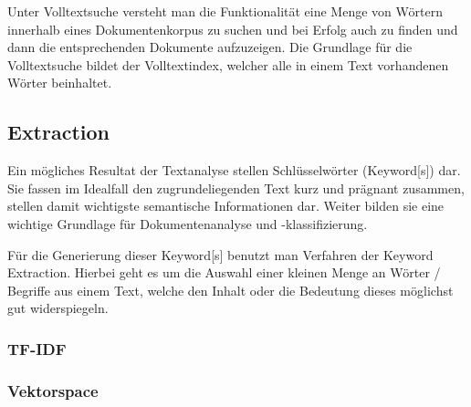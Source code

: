 
Unter \gls{Volltextsuche} versteht man die Funktionalität eine Menge von Wörtern innerhalb eines Dokumentenkorpus zu suchen und bei Erfolg auch zu finden und dann die entsprechenden Dokumente aufzuzeigen. Die Grundlage für die \gls{Volltextsuche} bildet der Volltextindex, welcher alle in einem Text vorhandenen Wörter beinhaltet.




\subsection{\gls{Extraction}}\label{keyword-extraction}


Ein mögliches Resultat der \gls{Textanalyse} stellen Schlüsselwörter (\gls{Keyword}[s]) dar. Sie fassen im Idealfall den zugrundeliegenden Text kurz und prägnant zusammen, stellen damit wichtigste semantische Informationen dar. Weiter bilden sie eine wichtige Grundlage für Dokumentenanalyse und -klassifizierung. 
\\\cite[S.~85]{Zhang2006}


Für die Generierung dieser \gls{Keyword}[s] benutzt man Verfahren der \gls{Keyword Extraction}. Hierbei geht es um die Auswahl einer kleinen Menge an Wörter / Begriffe aus einem Text, welche den Inhalt oder die Bedeutung dieses möglichst gut widerspiegeln.
\\\cite{hulth2004}


\subsubsection{TF-IDF}




\subsubsection{Vektorspace}

